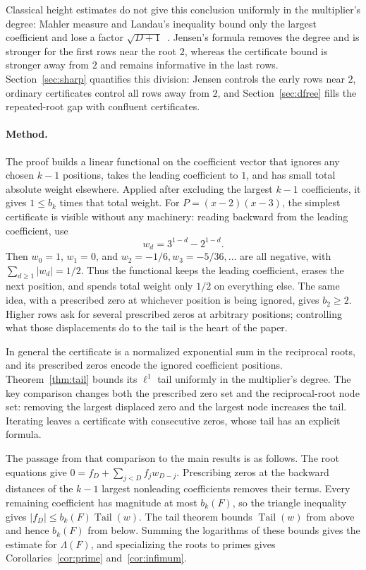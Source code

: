 \documentclass[11pt]{article}
\DeclareMathOperator{\Tail}{Tail}
\begin{document}
Classical height estimates do not give this conclusion uniformly in the
multiplier's degree: Mahler measure and Landau's inequality bound only the
largest coefficient and lose a factor $\sqrt{D+1}$~\cite{mignotte}.  Jensen's formula removes
the degree and is stronger for the first rows near the root $2$, whereas the
certificate bound is stronger away from $2$ and remains informative in the
last rows.  Section~\ref{sec:sharp} quantifies this division: Jensen controls
the early rows near $2$, ordinary certificates control all rows away from
$2$, and Section~\ref{sec:dfree} fills the repeated-root gap with confluent
certificates.

\paragraph{Method.}
The proof builds a linear functional on the coefficient vector that ignores
any chosen $k-1$ positions, takes the leading coefficient to $1$, and has
small total absolute weight elsewhere.  Applied after excluding the largest
$k-1$ coefficients, it gives $1\le b_k$ times that total weight.  For
$P=(x-2)(x-3)$, the simplest certificate is visible without any machinery:
reading backward from the leading coefficient, use
\[
  w_d=3^{1-d}-2^{1-d}.
\]
Then $w_0=1$, $w_1=0$, and
$w_2=-1/6,w_3=-5/36,\ldots$ are all negative, with
$\sum_{d\ge1}|w_d|=1/2$.  Thus the functional keeps the leading coefficient,
erases the next position, and spends total weight only $1/2$ on everything
else.  The same idea, with a prescribed zero at whichever position is being
ignored, gives $b_2\ge2$.  Higher rows ask for several prescribed zeros at
arbitrary positions; controlling what those displacements do to the tail is
the heart of the paper.

In general the certificate is a normalized exponential sum in the reciprocal
roots, and its prescribed zeros encode the ignored coefficient positions.
Theorem~\ref{thm:tail} bounds its $\ell^1$ tail uniformly in the multiplier's
degree.  The key comparison changes both the prescribed zero set and the
reciprocal-root node set: removing the largest displaced zero and the largest
node increases the tail.  Iterating leaves a certificate with consecutive
zeros, whose tail has an explicit formula.

The passage from that comparison to the main results is as follows.  The
root equations give
$0=f_D+\sum_{j<D}f_jw_{D-j}$.  Prescribing zeros at the backward distances of
the $k-1$ largest nonleading coefficients removes their terms.  Every
remaining coefficient has magnitude at most $b_k(F)$, so the triangle
inequality gives $|f_D|\le b_k(F)\Tail(w)$.  The tail theorem bounds
$\Tail(w)$ from above and hence $b_k(F)$ from below.  Summing the logarithms
of these bounds gives the estimate for $\Lambda(F)$, and specializing the
roots to primes gives Corollaries~\ref{cor:prime} and~\ref{cor:infimum}.
\end{document}
